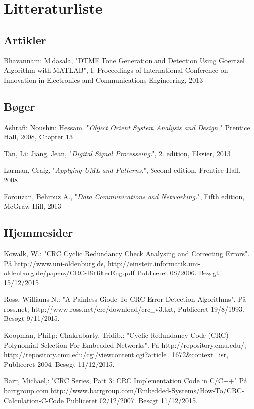 \section{Litteraturliste}
\begingroup
\renewcommand{\section}[2]{}%

\begin{thebibliography}{1}
	\subsection{Artikler}
	  Bhavannam: Midasala, "DTMF Tone Generation and Detection Using Goertzel Algorithm with MATLAB", I: Proceedings of International Conference on Innovation in Electronics and Communications Engineering, 2013
	
	\subsection{Bøger}
  
   Ashrafi: Noushin: Hessam. "{\em Object Orient System Analysis and Design.}" Prentice Hall, 2008, Chapter 13
  
   Tan, Li: Jiang, Jean, "{\em Digital Signal Processeing.}", 2. edition, Elsvier, 2013
  
   Larman, Craig, "{\em Applying UML and Patterns.}", Second edition, Prentice Hall, 2008
    
   Forouzan, Behrouz A., "{\em Data Communications and Networking.}", Fifth edition, McGraw-Hill, 2013
  
	\subsection{Hjemmesider}
   Kowalk, W.: "CRC Cyclic Redundancy Check Analysing and Correcting Errors". På http://www.uni-oldenburg.de, {http://einstein.informatik.uni-oldenburg.de/papers/CRC-BitfilterEng.pdf} Publiceret 08/2006. Besøgt 15/12/2015

   Ross, Williams N.: "A Painless Giode To CRC Error Detection Algorithms". På ross.net, {http://www.ross.net/crc/download/crc\_v3.txt}, Publiceret 19/8/1993. Besøgt 9/11/2015.
  
   Koopman, Philip: Chakrabarty, Tridib,: "Cyclic Redundancy Code (CRC) Polynomial Selection For Embedded Networks". På http://repository.cmu.edu/, {http://repository.cmu.edu/cgi/viewcontent.cgi?article=1672\&context=isr}, Publiceret 2004. Besøgt 11/12/2015.
  
   Barr, Michael,: "CRC Series, Part 3: CRC Implementation Code in C/C++" På barrgroup.com {http://www.barrgroup.com/Embedded-Systems/How-To/CRC-Calculation-C-Code} Publiceret 02/12/2007. Besøgt 11/12/2015.
  \end{thebibliography}